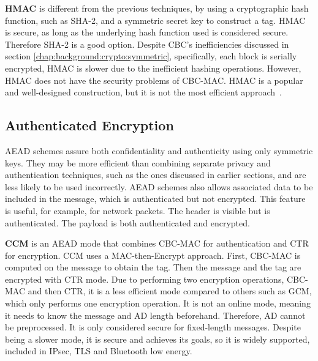 \textbf{\ac{HMAC}} is different from the previous techniques, by using a cryptographic hash function, such as SHA-2, and a symmetric secret key to construct a tag. \ac{HMAC} is secure, as long as the underlying hash function used is considered secure. Therefore SHA-2 is a good option.
Despite \ac{CBC}'s inefficiencies discussed in section \ref{chap:background:crypto:symmetric}, specifically, each block is serially encrypted, \ac{HMAC} is slower due to the inefficient hashing operations. However, \ac{HMAC} does not have the security problems of \ac{CBC-MAC}. \ac{HMAC} is a popular and well-designed construction, but it is not the most efficient approach~\cite{aesmodes}.


\subsection{Authenticated Encryption}\label{chap:background:crypto:aead}

 \ac{AEAD} schemes assure both confidentiality and authenticity using only symmetric keys. They may be more efficient than combining separate privacy and authentication techniques, such as the ones discussed in earlier sections, and are less likely to be used incorrectly. \ac{AEAD} schemes also allows associated data to be included in the message, which is authenticated but not encrypted. This feature is useful, for example, for network packets. The header is visible but is authenticated. The payload is both authenticated and encrypted. 

\textbf{\ac{CCM}} is an \ac{AEAD} mode that combines \ac{CBC-MAC} for authentication and \ac{CTR} for encryption.
\ac{CCM} uses a MAC-then-Encrypt approach. First, \ac{CBC-MAC} is computed on the message to obtain the tag. Then the message and the tag are encrypted with \ac{CTR} mode.
Due to performing two encryption operations, \ac{CBC-MAC} and then \ac{CTR}, it is a less efficient mode compared to others such as \ac{GCM}, which only performs one encryption operation.
It is not an online mode, meaning it needs to know the message and \ac{AD} length beforehand. Therefore, \ac{AD} cannot be preprocessed. It is only considered secure for fixed-length messages.
Despite being a slower mode, it is secure and achieves its goals, so it is widely supported, included in \ac{IPsec}, \ac{TLS} and Bluetooth low energy.



